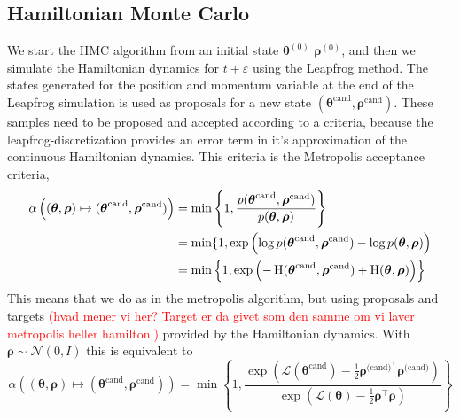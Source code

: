 \subsection{Hamiltonian Monte Carlo}
We start the HMC algorithm from an initial state $\boldsymbol{\theta}^{(0)}$ $\boldsymbol{\rho}^{(0)}$, and then we simulate the Hamiltonian dynamics for $t+\varepsilon$ using the Leapfrog method. The states generated for the position and momentum variable at the end of the Leapfrog simulation is used as proposals for a new state $(\boldsymbol{\theta}^{\text{cand}},\boldsymbol{\rho}^{\text{cand}})$. These samples need to be proposed and accepted according to a criteria, because the leapfrog-discretization provides an error term in it's approximation of the continuous Hamiltonian dynamics. This criteria is the Metropolis acceptance criteria,
\begin{equation}\label{eq:hmc_acceptance}
\begin{split}
    \alpha\left((\boldsymbol{\theta},\boldsymbol{\rho}) \mapsto (\boldsymbol{\theta}^{\text{cand}} , \boldsymbol{\rho}^{\text{cand}} )\right) &= \min\left\{1, \frac{p(\boldsymbol{\theta}^{\text{cand}},\boldsymbol{\rho}^{\text{cand}})}{p(\boldsymbol{\theta},\boldsymbol{\rho})} \right\}\\
    &= \min\{1,\exp\left(\log p(\boldsymbol{\theta}^{\text{cand}},\boldsymbol{\rho}^{\text{cand}})- \log p(\boldsymbol{\theta}, \boldsymbol{\rho})  \right)\\
    &= \min \left\{1,\exp\left(-\operatorname{H}(\boldsymbol{\theta}^{\text{cand}},\boldsymbol{\rho}^{\text{cand}}) +\operatorname{H}(\boldsymbol{\theta},\boldsymbol{\rho})\right) \right\}
\end{split}
\end{equation}
This means that we do as in the metropolis algorithm, but using proposals and targets \textcolor{red}{(hvad mener vi her? Target er da givet som den samme om vi laver metropolis heller hamilton.)} provided by the Hamiltonian dynamics. With $\boldsymbol{\rho}\sim \mathcal{N}\left(0,\mathit{I}\right)$ this is equivalent to
\begin{equation*}
\alpha\left((\boldsymbol{\theta},\boldsymbol{\rho}) \mapsto (\boldsymbol{\theta}^{\text{cand}} , \boldsymbol{\rho}^{\text{cand}} )\right) 
=\min\left\{1,\frac{\exp\left(\mathcal{L}(\boldsymbol{\theta}^{\text{cand}})-\frac{1}{2}\boldsymbol{\rho}^{\text{(cand)}^\top}\boldsymbol{\rho}^{\text{(cand)}}\right)}{\exp\left(\mathcal{L}(\boldsymbol{\theta})-\frac{1}{2}\boldsymbol{\rho}^\top\boldsymbol{\rho}\right)}\right\}
\end{equation*}
